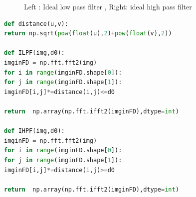\documentclass{article}
\begin{document}
\begin{figure}[H]
	\caption{Left : Ideal low pass filter , Right: ideal high pass filter}
\end{figure}
\begin{lstlisting}[language=Python]
def distance(u,v):
return np.sqrt(pow(float(u),2)+pow(float(v),2))

def ILPF(img,d0):
imginFD = np.fft.fft2(img)
for i in range(imginFD.shape[0]):
for j in range(imginFD.shape[1]):
imginFD[i,j]*=distance(i,j)<=d0

return  np.array(np.fft.ifft2(imginFD),dtype=int)

def IHPF(img,d0):
imginFD = np.fft.fft2(img)
for i in range(imginFD.shape[0]):
for j in range(imginFD.shape[1]):
imginFD[i,j]*=distance(i,j)>=d0

return  np.array(np.fft.ifft2(imginFD),dtype=int)
\end{lstlisting}
\end{document}
